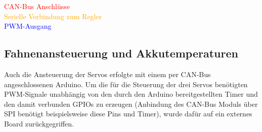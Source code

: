 \begin{minipage}{8.5cm}
\end{minipage}
\begin{minipage}{7cm}
    \textcolor{red}{CAN-Bus Anschlüsse}\\
    \textcolor{orange}{Serielle Verbindung zum Regler}\\
    \textcolor{blue}{PWM-Ausgang}\\
    
\end{minipage}

\newpage
\subsection{Fahnenansteuerung und Akkutemperaturen}
Auch die Ansteuerung der Servos erfolgte mit einem per CAN-Bus angeschlossenen Arduino. Um die für die Steuerung der drei Servos benötigten PWM-Signale unabhängig von den durch den Arduino bereitgestellten Timer und den damit verbunden GPIOs zu erzeugen 
(Anbindung des CAN-Bus Moduls über SPI benötigt beispielsweise diese Pins und Timer), wurde dafür auf ein externes Board zurückgegriffen.

